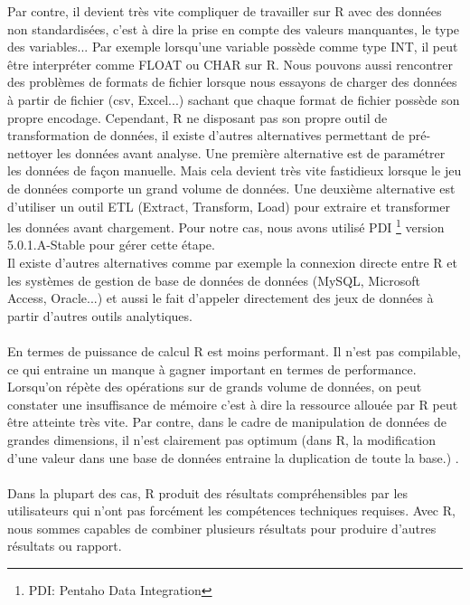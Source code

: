 \documentclass[11pt,a4paper]{report}
\begin{document}
Par contre, il devient très vite compliquer de travailler sur R avec des données non standardisées, c'est à dire la prise en compte des valeurs manquantes, le type des variables... Par exemple lorsqu'une variable possède comme type INT, il peut être interpréter comme FLOAT ou CHAR  sur R. Nous pouvons aussi rencontrer des problèmes de formats de fichier lorsque nous essayons de charger des données à partir de fichier (csv, Excel...) sachant que chaque format de fichier possède son propre encodage. Cependant, R ne disposant pas son propre outil de transformation de données, il existe d'autres alternatives permettant de pré-nettoyer les données avant analyse. Une première alternative est de paramétrer les données de façon manuelle. Mais cela devient très vite fastidieux lorsque le jeu de données comporte un grand volume de données. Une deuxième alternative est d'utiliser un outil ETL (Extract, Transform, Load) pour extraire et transformer les données avant chargement. Pour notre cas, nous avons utilisé PDI \footnote{PDI: Pentaho Data Integration} version 5.0.1.A-Stable pour gérer cette étape.\\
Il existe d'autres alternatives comme par exemple la connexion directe entre R et les systèmes de gestion de base de données de données (MySQL, Microsoft Access, Oracle...) et aussi le fait d'appeler directement des jeux de données à partir d'autres outils analytiques.\\\\
En termes de puissance de calcul R est moins performant. Il n'est pas compilable, ce qui entraine un manque à gagner important en termes de performance.
 Lorsqu'on répète des opérations sur de grands volume de données, on peut constater une insuffisance de mémoire c'est à dire la ressource allouée par R peut être atteinte très vite. Par contre, dans le cadre de manipulation de données de grandes dimensions, il n'est clairement pas optimum (dans R, la modification d'une valeur dans une base de données entraine la duplication de toute la base.) \cite{next_step}.\\\\
 Dans la plupart des cas, R produit des résultats compréhensibles par les utilisateurs qui n'ont pas forcément les compétences techniques requises. Avec R, nous sommes capables de combiner plusieurs résultats pour produire d'autres résultats ou rapport.  
\end{document}
